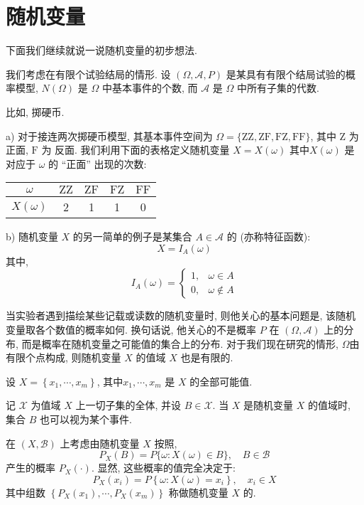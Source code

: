 \section{随机变量}
下面我们继续就说一说随机变量的初步想法. 

我们考虑在有限个试验结局的情形. 设 $(\Omega, \mathscr{A}, P)$ 是某具有有限个结局试验的概率模型, $N(\Omega)$ 是 $\Omega$ 中基本事件的个数, 而 $\mathscr{A}$ 是 $\Omega$ 中所有子集的代数. 

比如, 掷硬币. 

\begin{example}
    a) 对于接连两次掷硬币模型, 其基本事件空间为 $\Omega=\{\mathrm{ZZ}, \mathrm{ZF}, \mathrm{FZ}, \mathrm{FF}\}$, 其中 $\mathrm{Z}$ 为 正面, $\mathrm{F}$ 为 反面. 我们利用下面的表格定义随机变量 $X=X(\omega)$ 其中$X(\omega)$ 是对应于 $\omega$ 的 ``正面'' 出现的次数:
    \begin{tabular}{c|c|c|c|c}
        \hline$\omega$ & $\mathrm{ZZ}$ & $\mathrm{ZF}$ & $\mathrm{FZ}$ & $\mathrm{FF}$ \\
        \hline$X(\omega)$ & 2 & 1 & 1 & 0 \\
        \hline
        \end{tabular}

        b) 随机变量 $X$ 的另一简单的例子是某集合 $A \in \mathscr{A}$ 的 (亦称特征函数):
        $$
        X=I_A(\omega)
        $$其中, $$
        I_A(\omega)= \begin{cases}1, & \omega \in A \\ 0, & \omega \notin A\end{cases}
        $$
\end{example}

当实验者遇到描绘某些记载或读数的随机变量时, 则他关心的基本问题是, 该随机
变量取各个数值的概率如何. 换句话说, 他关心的不是概率 $P$ 在 $(\Omega, \mathscr{A})$ 上的分布, 而是概率在随机变量之可能值的集合上的分布. 对于我们现在研究的情形, $\Omega$由有限个点构成, 则随机变量 $X$ 的值域 $X$ 也是有限的.

设 $X=\left\{x_1, \cdots, x_m\right\}$, 其中$x_1, \cdots, x_m$ 是 $X$ 的全部可能值.

记 $\mathscr{X}$ 为值域 $X$ 上一切子集的全体, 并设 $B \in \mathscr{X}$. 当 $X$ 是随机变量 $X$ 的值域时, 集合 $B$ 也可以视为某个事件.

在 $(X, \mathscr{B})$ 上考虑由随机变量 $X$ 按照,
$$
P_{X}(B)=P\{\omega: X(\omega) \in B\}, \quad B \in \mathscr{B}
$$
产生的概率 $P_{X}(\cdot)$. 显然, 这些概率的值完全决定于:
$$
P_{X}\left(x_i\right)=P\left\{\omega: X(\omega)=x_i\right\}, \quad x_i \in X
$$
其中组数 $\left\{P_{X}\left(x_1\right), \cdots, P_{X}\left(x_m\right)\right\}$ 称做随机变量 $X$ 的.

